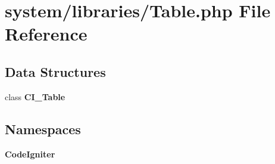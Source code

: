 \section{system/libraries/\-Table.php File Reference}
\label{_table_8php}
\subsection*{Data Structures}
\begin{DoxyCompactItemize}
\item 
class {\bf C\-I\-\_\-\-Table}
\end{DoxyCompactItemize}
\subsection*{Namespaces}
\begin{DoxyCompactItemize}
\item 
{\bf Code\-Igniter}
\end{DoxyCompactItemize}
